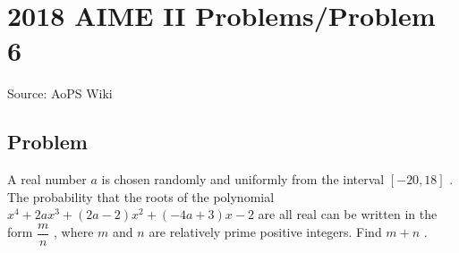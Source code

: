 \documentclass[12pt]{article}
\begin{document}
\section*{{2018 AIME II Problems/Problem 6}}
Source: AoPS Wiki

\subsection*{Problem}
A real number $a$ is chosen randomly and uniformly from the interval $[-20, 18]$ . The probability that the roots of the polynomial $x^4 + 2ax^3 + (2a - 2)x^2 + (-4a + 3)x - 2$ are all real can be written in the form $\dfrac{m}{n}$ , where $m$ and $n$ are relatively prime positive integers. Find $m + n$ .
\end{document}

